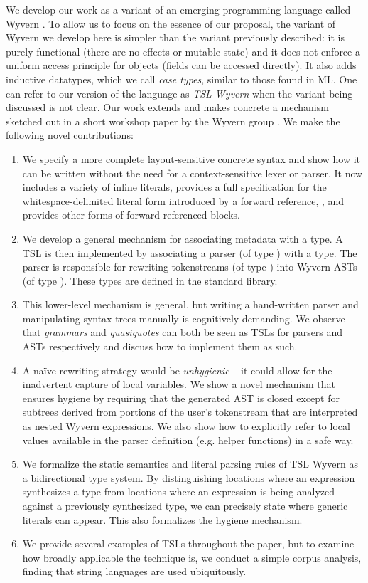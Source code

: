 We develop our work as a variant of an emerging programming language called Wyvern \cite{Nistor:2013:WST:2489828.2489830}. To allow us to focus on the essence of our proposal, the variant of Wyvern we develop here is simpler than the variant previously described: it is purely functional (there are no effects or mutable state) and it does not enforce a uniform access principle for objects (fields can be accessed directly). It also adds inductive datatypes, which we call \emph{case types}, similar to those found in ML. One can refer to our version of the language as \emph{TSL Wyvern} when the variant being discussed is not clear. Our work extends and makes concrete a mechanism sketched out in a short workshop paper by the Wyvern group \cite{Omar:2013:TWP:2489812.2489815}. We make the following novel contributions:
\begin{enumerate}
\item We specify a more complete layout-sensitive concrete syntax and show how it can be written without the need for a context-sensitive lexer or parser. It now includes a variety of inline literals, provides a full specification for the whitespace-delimited literal form introduced by a forward reference, \li{~}, and provides other forms of forward-referenced blocks.
\item We develop a general mechanism for associating metadata with a type. A TSL is then implemented by associating a parser (of type ) with a type. The parser is responsible for rewriting tokenstreams (of type ) into Wyvern ASTs (of type ). These types are defined in the standard library.
\item This lower-level mechanism is general, but writing a hand-written parser and manipulating syntax trees manually is cognitively demanding. We observe that \emph{grammars} and \emph{quasiquotes} can both be seen as TSLs for parsers and ASTs respectively and discuss how to implement them as such.
\item A na\"ive rewriting strategy would be \emph{unhygienic} -- it could allow for the inadvertent capture of local variables. We show a novel mechanism that ensures hygiene by requiring that the generated AST is closed except for subtrees derived from portions of the user's tokenstream that are interpreted as nested Wyvern expressions. We also show how to explicitly refer to local values available in the parser definition (e.g. helper functions) in a safe way. 
\item We formalize the static semantics and literal parsing rules of TSL Wyvern as a bidirectional type system. By distinguishing locations where an expression synthesizes a type from locations where an expression is being analyzed against a previously synthesized type, we can precisely state where generic literals can appear. This also formalizes the hygiene mechanism.
\item We provide several examples of TSLs throughout the paper, but to examine how broadly applicable the technique is, we conduct a simple corpus analysis, finding that string languages are used ubiquitously.
\end{enumerate}
